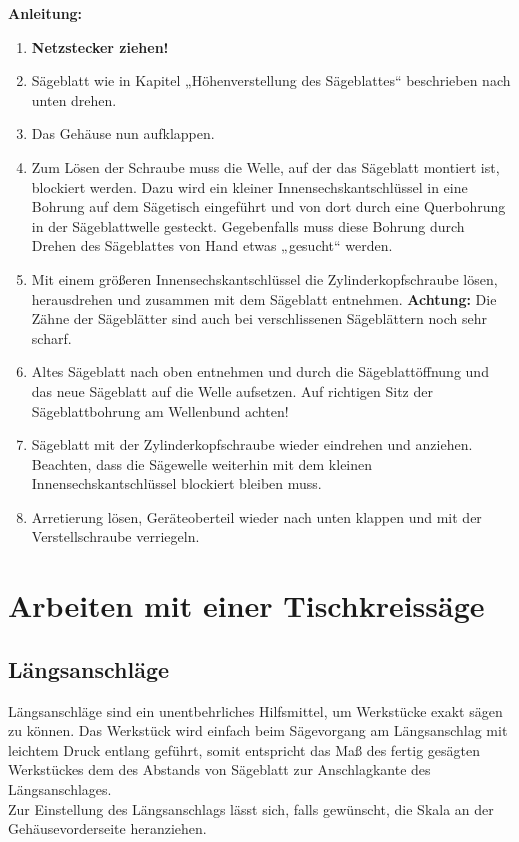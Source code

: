 \documentclass{\basedir/fablab-document}
\begin{document}
\textbf{Anleitung:} \\
\renewcommand{\labelenumi}{\alph{enumi})}
\begin{enumerate}
	\item \textbf{Netzstecker ziehen!}
	\item Sägeblatt wie in Kapitel „Höhenverstellung des Sägeblattes“ beschrieben nach unten drehen.
	\item Das Gehäuse nun aufklappen.
	\item Zum Lösen der Schraube  muss die Welle, auf der das Sägeblatt montiert ist, blockiert werden. Dazu wird ein kleiner Innensechskantschlüssel in eine Bohrung auf dem Sägetisch eingeführt und von dort durch eine Querbohrung in der Sägeblattwelle gesteckt. Gegebenfalls muss diese Bohrung durch Drehen des Sägeblattes von Hand etwas „gesucht“ werden.
	\item Mit einem größeren Innensechskantschlüssel die Zylinderkopfschraube lösen, herausdrehen und zusammen mit dem Sägeblatt entnehmen.
	\textbf{Achtung:}
	Die Zähne der Sägeblätter sind auch bei verschlissenen Sägeblättern noch sehr scharf.
	\item Altes Sägeblatt nach oben entnehmen und durch die Sägeblattöffnung und das neue Sägeblatt auf die Welle aufsetzen. Auf richtigen Sitz der Sägeblattbohrung am Wellenbund achten!
	\item Sägeblatt mit der Zylinderkopfschraube wieder eindrehen und anziehen. Beachten, dass die Sägewelle weiterhin mit dem kleinen Innensechskantschlüssel blockiert bleiben muss.
	\item Arretierung lösen, Geräteoberteil wieder nach unten klappen und mit der Verstellschraube verriegeln.
\end{enumerate}

\section{Arbeiten mit einer Tischkreissäge}

\subsection{Längsanschläge}
Längsanschläge sind ein unentbehrliches Hilfsmittel, um Werkstücke exakt sägen zu können. Das Werkstück wird einfach beim Sägevorgang am Längsanschlag mit leichtem Druck entlang geführt, somit entspricht das Maß des fertig gesägten Werkstückes dem des Abstands von Sägeblatt zur Anschlagkante des Längsanschlages. \\
Zur Einstellung des Längsanschlags lässt sich, falls gewünscht, die Skala an der Gehäusevorderseite heranziehen.
\end{document}
